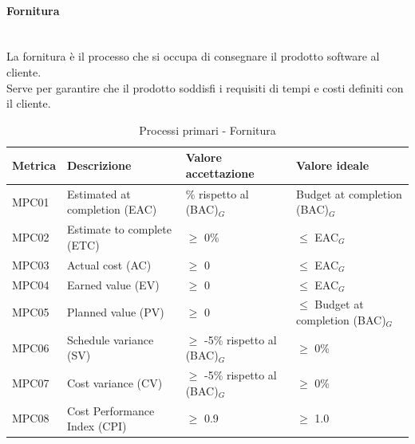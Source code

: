 \documentclass[10pt]{article}
\begin{document}
\begin{justify}
\paragraph{Fornitura}\mbox{}\\
La fornitura è il processo che si occupa di consegnare il prodotto software al cliente.\\
Serve per garantire che il prodotto soddisfi i requisiti di tempi e costi definiti con il cliente.\\
\begin{table}[H]
\centering
\begin{tabular}{|>{\centering\arraybackslash}p{1.5cm}|>{\centering\arraybackslash}p{5cm}|>{\centering\arraybackslash}p{4cm}|>{\centering\arraybackslash}p{3.7cm}|}
  \hline
  \textbf{Metrica} & \textbf{Descrizione} & \textbf{Valore accettazione} & \textbf{Valore ideale}\\
  \hline
  MPC01 & Estimated at completion (EAC) & \textpm5\% rispetto al (BAC)\(_G\) & Budget at completion (BAC)\(_G\)\\
  \hline
  MPC02 & Estimate to complete (ETC) & $\geq$ 0\% & $\leq$ EAC\(_G\) \\
  \hline
  MPC03 & Actual cost (AC) & $\geq$ 0 & $\leq$ EAC\(_G\) \\
  \hline
  MPC04 & Earned value (EV) & $\geq$ 0 & $\leq$ EAC\(_G\) \\
  \hline
  MPC05 & Planned value (PV) & $\geq$ 0 & $\leq$ Budget at completion (BAC)\(_G\) \\
  \hline
  MPC06 & Schedule variance (SV) & $\geq$ -5\% rispetto al (BAC)\(_G\) & $\geq$ 0\% \\
  \hline
  MPC07 & Cost variance (CV) & $\geq$ -5\% rispetto al (BAC)\(_G\) & $\geq$ 0\% \\
  \hline
  MPC08 & Cost Performance Index (CPI) & $\geq$ 0.9 & $\geq$ 1.0 \\
  \hline
\end{tabular}
\caption{Processi primari - Fornitura}
\label{tab:fornitura}
\end{table}


\end{justify}
\end{document}
